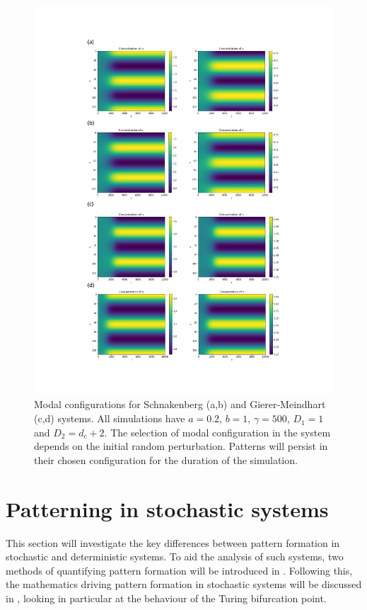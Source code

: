 \documentclass[12pt]{article}
\begin{document}
\begin{center}
\begin{figure}
  \includegraphics[scale = 0.6]{Fig_1.pdf}
  \caption{Modal configurations for Schnakenberg (a,b) and Gierer-Meindhart (c,d) systems. All simulations have $a = 0.2$, $b = 1$, $\gamma = 500$, $D_1 = 1$ and $D_2 = d_c + 2$. The selection of modal configuration in the system depends on the initial random perturbation. Patterns will persist in their chosen configuration for the duration of the simulation.}
\end{figure}
\end{center}
\section{Patterning in stochastic systems}

This section will investigate the key differences between pattern formation in stochastic and deterministic systems. To aid the analysis of such systems, two methods of quantifying pattern formation will be introduced in . Following this, the mathematics driving pattern formation in stochastic systems will be discussed in , looking in particular at the behaviour of the Turing bifurcation point. 
\end{document}
